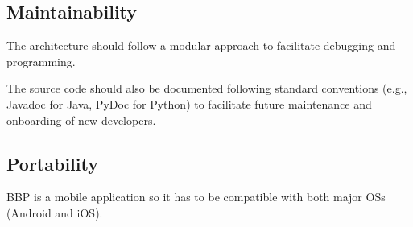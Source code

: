 \subsection{Maintainability}

The architecture should follow a modular approach to facilitate debugging and programming.

The source code should also be documented following standard conventions (e.g., Javadoc for Java, PyDoc for Python) to facilitate future maintenance and onboarding of new developers.

\subsection{Portability}

BBP is a mobile application so it has to be compatible with both major OSs (Android and iOS).
